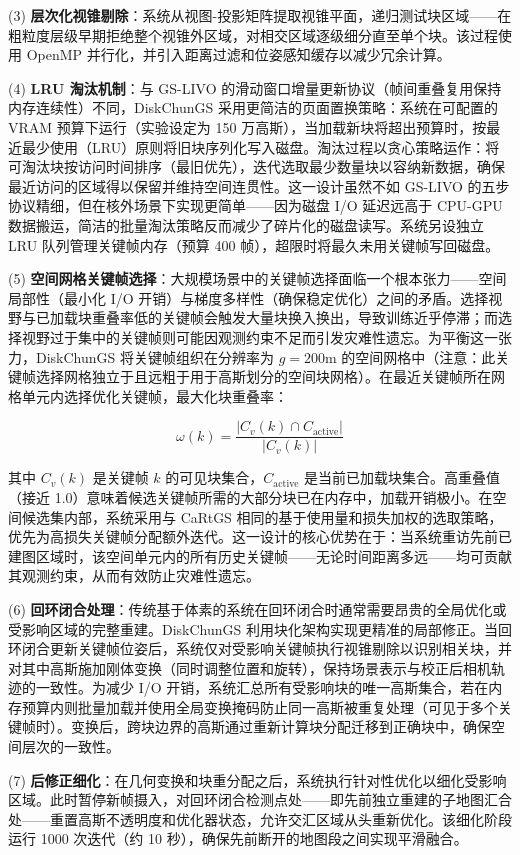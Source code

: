(3) \textbf{层次化视锥剔除}：系统从视图-投影矩阵提取视锥平面，递归测试块区域——在粗粒度层级早期拒绝整个视锥外区域，对相交区域逐级细分直至单个块。该过程使用 OpenMP 并行化，并引入距离过滤和位姿感知缓存以减少冗余计算。

(4) \textbf{LRU 淘汰机制}：与 GS-LIVO 的滑动窗口增量更新协议（帧间重叠复用保持内存连续性）不同，DiskChunGS 采用更简洁的页面置换策略：系统在可配置的 VRAM 预算下运行（实验设定为 150 万高斯），当加载新块将超出预算时，按最近最少使用（LRU）原则将旧块序列化写入磁盘。淘汰过程以贪心策略运作：将可淘汰块按访问时间排序（最旧优先），迭代选取最少数量块以容纳新数据，确保最近访问的区域得以保留并维持空间连贯性。这一设计虽然不如 GS-LIVO 的五步协议精细，但在核外场景下实现更简单——因为磁盘 I/O 延迟远高于 CPU-GPU 数据搬运，简洁的批量淘汰策略反而减少了碎片化的磁盘读写。系统另设独立 LRU 队列管理关键帧内存（预算 400 帧），超限时将最久未用关键帧写回磁盘。

(5) \textbf{空间网格关键帧选择}：大规模场景中的关键帧选择面临一个根本张力——空间局部性（最小化 I/O 开销）与梯度多样性（确保稳定优化）之间的矛盾。选择视野与已加载块重叠率低的关键帧会触发大量块换入换出，导致训练近乎停滞；而选择视野过于集中的关键帧则可能因观测约束不足而引发灾难性遗忘。为平衡这一张力，DiskChunGS 将关键帧组织在分辨率为 $g = 200$m 的空间网格中（注意：此关键帧选择网格独立于且远粗于用于高斯划分的空间块网格）。在最近关键帧所在网格单元内选择优化关键帧，最大化块重叠率：

\[
\omega(k) = \frac{|C_v(k) \cap C_{\mathrm{active}}|}{|C_v(k)|}
\]

其中 $C_v(k)$ 是关键帧 $k$ 的可见块集合，$C_{\mathrm{active}}$ 是当前已加载块集合。高重叠值（接近 1.0）意味着候选关键帧所需的大部分块已在内存中，加载开销极小。在空间候选集内部，系统采用与 CaRtGS 相同的基于使用量和损失加权的选取策略，优先为高损失关键帧分配额外迭代。这一设计的核心优势在于：当系统重访先前已建图区域时，该空间单元内的所有历史关键帧——无论时间距离多远——均可贡献其观测约束，从而有效防止灾难性遗忘。

(6) \textbf{回环闭合处理}：传统基于体素的系统在回环闭合时通常需要昂贵的全局优化或受影响区域的完整重建。DiskChunGS 利用块化架构实现更精准的局部修正。当回环闭合更新关键帧位姿后，系统仅对受影响关键帧执行视锥剔除以识别相关块，并对其中高斯施加刚体变换（同时调整位置和旋转），保持场景表示与校正后相机轨迹的一致性。为减少 I/O 开销，系统汇总所有受影响块的唯一高斯集合，若在内存预算内则批量加载并使用全局变换掩码防止同一高斯被重复处理（可见于多个关键帧时）。变换后，跨块边界的高斯通过重新计算块分配迁移到正确块中，确保空间层次的一致性。

(7) \textbf{后修正细化}：在几何变换和块重分配之后，系统执行针对性优化以细化受影响区域。此时暂停新帧摄入，对回环闭合检测点处——即先前独立重建的子地图汇合处——重置高斯不透明度和优化器状态，允许交汇区域从头重新优化。该细化阶段运行 1000 次迭代（约 10 秒），确保先前断开的地图段之间实现平滑融合。


